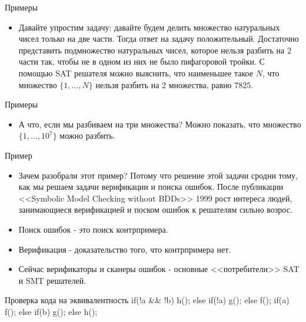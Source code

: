 \documentclass{beamer}
\begin{document}
\begin{frame}{Примеры}
\begin{itemize}
\item Давайте упростим задачу: давайте будем делить множество натуральных чисел только на две части. Тогда ответ на задачу
положительный. Достаточно представить подмножество натуральных чисел, которое нельзя разбить на 2 части так, чтобы не в одном
из них не было пифагоровой тройки. С помощью SAT решателя можно выяснить, что наименьшее такое $N$, что множество
$\{1, \dots, N\}$ нельзя разбить на 2 множества, равно $7825$.
\end{itemize}
\end{frame}

\begin{frame}{Примеры}
\begin{itemize}
\item А что, если мы разбиваем на три множества? Можно показать, что множество $\{1, \dots, 10^7\}$ можно разбить.
\end{itemize}
\end{frame}

\begin{frame}{Пример}
\begin{itemize}
\item Зачем разобрали этот пример? Потому что решение этой задачи сродни тому, как мы решаем задачи верификации и поиска ошибок.
После публикации <<Symbolic Model Checking without BDDs>> 1999 рост интереса людей, занимающиеся верификацией и поском ошибок к
решателям сильно возрос.
\item Поиск ошибок - это поиск контрпримера.
\item Верификация - доказательство того, что контрпримера нет.
\item Сейчас верификаторы и сканеры ошибок - основные <<потребители>> SAT и SMT решателей.
\end{itemize}
\end{frame}

\begin{frame}{Проверка кода на эквивалентность}
if(!a \&\& !b) h();\newline
else if(!a) g();\newline
else f();\newline
\newline
if(a) f();\newline
else if(b) g();\newline
else h();
\end{frame}
\end{document}
